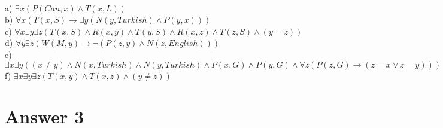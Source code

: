 \documentclass[12pt]{article}
\begin{document}
\hspace{5mm} \\
\hspace{5mm} a) $ \exists x (P(Can,x) \wedge T(x,L)) $\\
\hspace{5mm} b) $ \forall x (T(x,S) \rightarrow \exists y(N(y,Turkish) \wedge P(y,x))) $\\
\hspace{5mm} c) $ \forall x \exists y \exists z (T(x,S) \wedge R(x,y) \wedge T(y,S) \wedge R(x,z) \wedge T(z,S) \wedge (y=z))$\\
\hspace{5mm} d) $ \forall y \exists z (W(M,y) \rightarrow \neg (P(z,y) \wedge N(z,English)))$\\
\hspace{5mm} e) $ \exists x \exists y ((x \not=y) \wedge N(x,Turkish) \wedge N(y,Turkish) \wedge P(x,G) \wedge P(y,G) \wedge \forall z(P(z,G) \rightarrow (z =x  \lor z=y )))$\\
\hspace{5mm} f) $ \exists x \exists y \exists z (T(x,y) \wedge T(x,z) \wedge (y \not=z))$\\


\section*{Answer 3}
\end{document}
